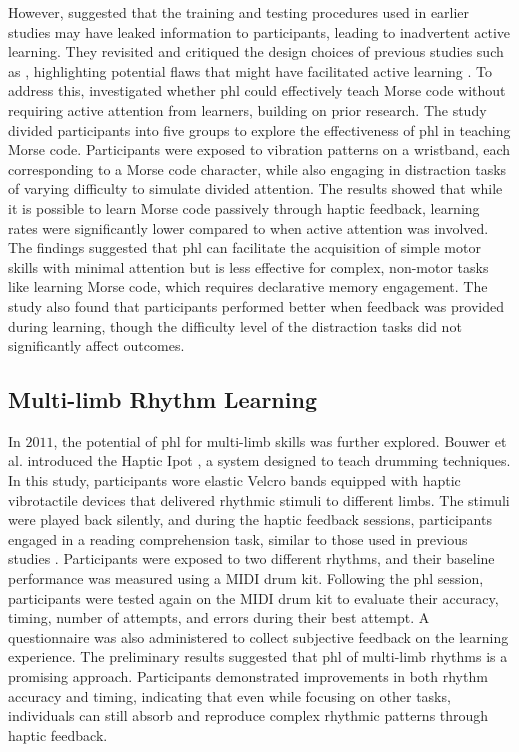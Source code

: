 However, \cite{Pescara2019} suggested that the training and testing procedures used in earlier studies may have leaked information to participants, leading to inadvertent active learning. They revisited and critiqued the design choices of previous studies such as \cite{Seim2016a, Seim2018}, highlighting potential flaws that might have facilitated active learning \cite{Pescara2019}.
To address this, \cite{Pescara2019} investigated whether \gls{phl} could effectively teach Morse code without requiring active attention from learners, building on prior research. The study divided participants into five groups to explore the effectiveness of \gls{phl} in teaching Morse code. Participants were exposed to vibration patterns on a wristband, each corresponding to a Morse code character, while also engaging in distraction tasks of varying difficulty to simulate divided attention.
The results showed that while it is possible to learn Morse code passively through haptic feedback, learning rates were significantly lower compared to when active attention was involved. The findings suggested that \gls{phl} can facilitate the acquisition of simple motor skills with minimal attention but is less effective for complex, non-motor tasks like learning Morse code, which requires declarative memory engagement. The study also found that participants performed better when feedback was provided during learning, though the difficulty level of the distraction tasks did not significantly affect outcomes.

\subsection{Multi-limb Rhythm Learning}
In $2011$, the potential of \gls{phl} for multi-limb skills was further explored. Bouwer et al. \cite{Bouwer2011} introduced the Haptic Ipot \cite{Holland2010, Bouwer2011}, a system designed to teach drumming techniques. In this study, participants wore elastic Velcro bands equipped with haptic vibrotactile devices that delivered rhythmic stimuli to different limbs. The stimuli were played back silently, and during the haptic feedback sessions, participants engaged in a reading comprehension task, similar to those used in previous studies \cite{Huang2008, Huang2010}.
Participants were exposed to two different rhythms, and their baseline performance was measured using a MIDI drum kit. Following the \gls{phl} session, participants were tested again on the MIDI drum kit to evaluate their accuracy, timing, number of attempts, and errors during their best attempt. A questionnaire was also administered to collect subjective feedback on the learning experience.
The preliminary results suggested that \gls{phl} of multi-limb rhythms is a promising approach. Participants demonstrated improvements in both rhythm accuracy and timing, indicating that even while focusing on other tasks, individuals can still absorb and reproduce complex rhythmic patterns through haptic feedback.


